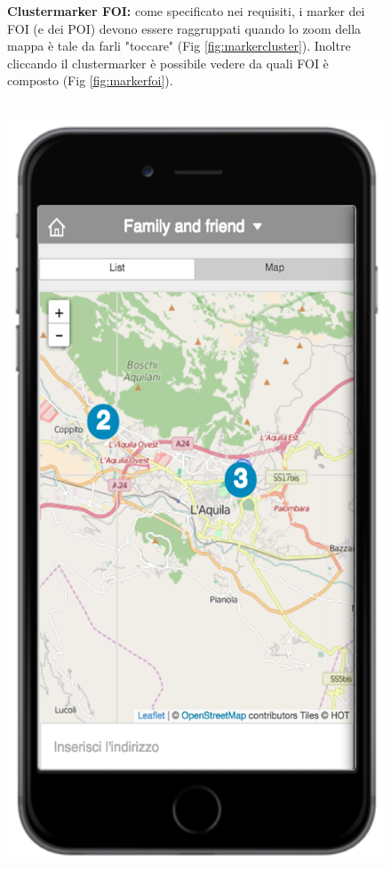  \begin{figure}
 \textbf{Clustermarker FOI:} come specificato nei requisiti, i marker dei FOI (e dei POI) devono essere raggruppati quando lo zoom della mappa è tale da farli "toccare" (Fig \ref{fig:markercluster}). Inoltre cliccando il clustermarker è possibile vedere da quali FOI è composto (Fig \ref{fig:markerfoi}). 
 \\ \\
 \begin{minipage}[b]{6cm}
   \centering
	\includegraphics[scale=0.6]{interfaccia/markercluster.png}

\end{minipage}
\end{figure}
